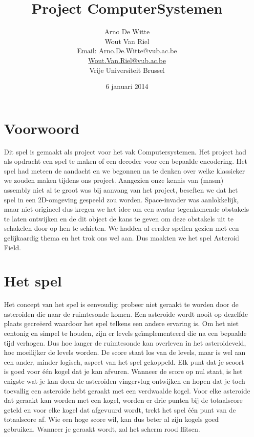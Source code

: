 \documentclass{article}
\title{Project ComputerSystemen}
\author{Arno De Witte \\Wout Van Riel  \\Email: \href{mailto:Arno.De.Witte@vub.ac.be}{Arno.De.Witte@vub.ac.be} \\ \href{mailto:Wout.Van.Riel@vub.ac.be}{Wout.Van.Riel@vub.ac.be} \\ %
Vrije Universiteit Brussel}
\date{6 januari 2014}
\begin{document}
\maketitle
\newpage
\tableofcontents
\newpage


\section{Voorwoord}
Dit spel is gemaakt als project voor het vak Computersystemen.
Het project had als opdracht een spel te maken of een decoder voor een bepaalde encodering.
Het spel had meteen de aandacht en we begonnen na te denken over welke klassieker we zouden maken tijdens ons project.
Aangezien onze kennis van (masm) assembly niet al te groot was bij aanvang van het project, beseften we dat het spel in een 2D-omgeving gespeeld zou worden.
Space-invader was aanlokkelijk, maar niet origineel dus kregen we het idee om een avatar tegenkomende obstakels te laten ontwijken en de dit object de kans te geven om deze obstakels uit te schakelen door op hen te schieten.
We hadden al eerder spellen gezien met een gelijkaardig thema en het trok ons wel aan. Dus maakten we het spel Asteroid Field.

\section{Het spel}\label{spel}

Het concept van het spel is eenvoudig: probeer niet geraakt te worden door de asteroiden die naar de ruimtesonde komen.
Een asteroide wordt nooit op dezelfde plaats gecreëerd waardoor het spel telkens een andere ervaring is.
Om het niet eentonig en simpel te houden, zijn er levels ge\"implementeerd die na een bepaalde tijd verhogen.
Dus hoe langer de ruimtesonde kan overleven in het asteroideveld, hoe moeilijker de levels worden.
De score staat los van de levels, maar is wel aan een ander, minder logisch, aspect van het spel gekoppeld.
Elk punt dat je scoort is goed voor \'e\'en kogel dat je kan afvuren.
Wanneer de score op nul staat, is het enigste wat je kan doen de asteroiden vingervlug ontwijken en hopen dat je toch toevallig een asteroide hebt geraakt met een verdwaalde kogel.
Voor elke asteroide dat geraakt kan worden met een kogel, worden er drie punten bij de totaalscore geteld en voor elke kogel dat afgevuurd wordt, trekt het spel \'e\'en punt van de totaalscore af.
Wie een hoge score wil, kan dus beter al zijn kogels goed gebruiken.
Wanneer je geraakt wordt, zal het scherm rood flitsen.
\end{document}
